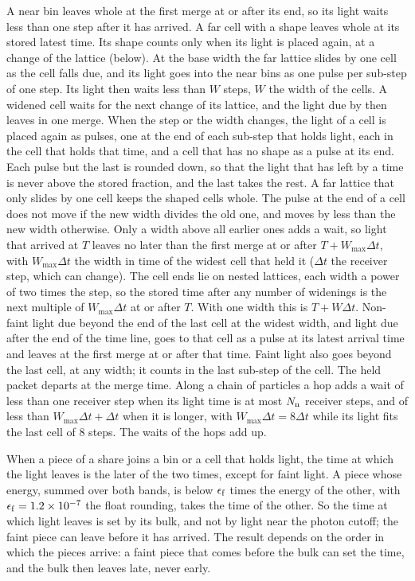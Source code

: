 A near bin leaves whole at the first merge at or after its end, so its light
waits less than one step after it has arrived. A far cell with a shape leaves
whole at its stored latest time. Its shape counts only when its light is placed
again, at a change of the lattice (below). At the base width the far lattice
slides by one cell as the cell falls due, and its light goes into the near bins
as one pulse per sub-step of one step. Its light then waits less than $W$ steps,
$W$ the width of the cells. A widened cell waits for the next change of its
lattice, and the light due by then leaves in one merge.
When the step or the width changes, the light of a cell is placed again as
pulses, one at the end of each sub-step that holds light, each in the cell that
holds that time, and a cell that has no shape as a pulse at its end. Each pulse but the last is
rounded down, so that the light that has left by a time is never above the
stored fraction, and the last takes the rest. A far lattice that only slides
by one cell keeps the shaped cells whole. The pulse at the end of a cell does
not move if the new width divides the old one, and moves by less than the new
width otherwise.
Only a width above all earlier ones adds a wait, so light that arrived at $T$
leaves no later than the first merge at or after $T+W_{\max}\Delta t$, with
$W_{\max}\Delta t$ the width in time of the widest cell that held it ($\Delta t$
the receiver step, which can change). The cell ends lie on nested lattices,
each width a power of two times the step, so the stored time after any number of
widenings is the next multiple of $W_{\max}\Delta t$ at or after $T$. With one
width this is $T+W\Delta t$. Non-faint light due beyond the end of the last
cell at the widest width, and light due after the end of the time line, goes
to that cell as a pulse at its latest arrival time and leaves at the first merge
at or after that time. Faint light also goes beyond the last cell, at any width;
it counts in the last sub-step of the cell. The held packet departs at the merge time. Along a chain of
particles a hop adds a wait of less than one receiver step when its light time
is at most $N_{\rm n}$ receiver steps, and of less than $W_{\max}\Delta t+\Delta t$ when it is
longer, with $W_{\max}\Delta t=8\Delta t$ while its light fits the last cell of
$8$ steps. The
waits of the hops add up.

When a piece of a share joins a bin or a cell that holds light, the time at
which the light leaves is the later of the two times, except for faint light.
A piece whose energy, summed over both bands, is below $\epsilon_{\rm f}$ times
the energy of the other, with $\epsilon_{\rm f}=1.2\times10^{-7}$ the float
rounding, takes the time of the other. So the time at which light leaves is set
by its bulk, and not by light near the photon cutoff; the faint piece can leave
before it has arrived. The result depends on the order in which the pieces
arrive: a faint piece that comes before the bulk can set the time, and the
bulk then leaves late, never early.

